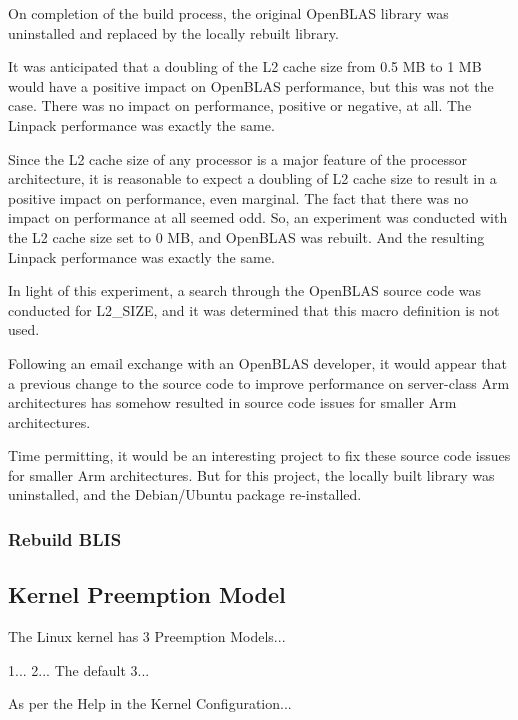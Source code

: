 \documentclass{report}
\begin{document}
On completion of the build process, the original OpenBLAS library was uninstalled and replaced by the locally rebuilt library.

It was anticipated that a doubling of the L2 cache size from 0.5 MB to 1 MB would have a positive impact on OpenBLAS performance, but this was not the case. There was no impact on performance, positive or negative, at all. The Linpack performance was exactly the same.

Since the L2 cache size of any processor is a major feature of the processor architecture, it is reasonable to expect a doubling of L2 cache size to result in a positive impact on performance, even marginal. The fact that there was no impact on performance at all seemed odd. So, an experiment was conducted with the L2 cache size set to 0 MB, and OpenBLAS was rebuilt. And the resulting Linpack performance was exactly the same. 

In light of this experiment, a search through the OpenBLAS source code was conducted for L2\_SIZE, and it was determined that this macro definition is not used.

Following an email exchange with an OpenBLAS developer, it would appear that a previous change to the source code to improve performance on server-class Arm architectures has somehow resulted in source code issues for smaller Arm architectures.

Time permitting, it would be an interesting project to fix these source code issues for smaller Arm architectures. But for this project, the locally built library was uninstalled, and the Debian/Ubuntu package re-installed.


%
%
\subsubsection{Rebuild BLIS}


%
%
\subsection{Kernel Preemption Model}

The Linux kernel has 3 Preemption Models...

1...
2... The default
3...


As per the Help in the Kernel Configuration...
\end{document}
